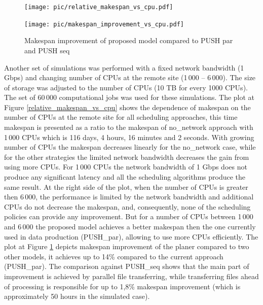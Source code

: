 \documentclass{svjour3}                     %
\begin{document}
\begin{figure}[h]
\centering
\begin{minipage}{.7\textwidth}
\centering
    \texttt{[image: pic/relative\_makespan\_vs\_cpu.pdf]}

    \caption{Dependence of makespan on number of CPUs at the remote node connected over 1 Gbps link.}
    \label{relative_makespan_vs_cpu}
\end{minipage}\hspace{1pc}%
\begin{minipage}{.7\textwidth}
\centering
    \texttt{[image: pic/makespan\_improvement\_vs\_cpu.pdf]}
    \caption{Makespan improvement of proposed model compared to PUSH par and PUSH seq}
    \label{makespan_improvement_vs_cpu}
\end{minipage} 
\end{figure}
Another set of simulations was performed with a fixed network bandwidth (1 Gbps) and changing number of CPUs at the remote site (1\,000 -- 6\,000). The size of storage was adjusted to the number of CPUs (10 TB for every 1000 CPUs). The set of 60\,000 computational jobs was used for these simulations. The plot at Figure \ref{relative_makespan_vs_cpu} shows the dependence of makespan on the number of CPUs at the remote site for all scheduling approaches, this time makespan is presented as a ratio to the makespan of no\_network approach with 1\,000 CPUs which is 116 days, 4 hours, 16 minutes and 2 seconds. With growing number of CPUs the makespan decreases linearly for the no\_network case, while for the other strategies the limited network bandwidth decreases the gain from using more CPUs. For 1\,000 CPUs the network bandwidth of 1 Gbps does not produce any significant latency and all the scheduling algorithms produce the same result. At the right side of the plot, when the number of CPUs is greater then 6\,000, the performance is limited by the network bandwidth and additional CPUs do not decrease the makespan, and, consequently, none of the scheduling policies can provide any improvement. But for a number of CPUs between 1\,000 and 6\,000 the proposed model achieves a better makespan then the one currently used in data production (PUSH\_par), allowing to use more CPUs efficiently. The plot at Figure \ref{makespan_improvement_vs_cpu} depicts makespan improvement of the planer compared to two other models, it achieves up to 14\% compared to the current approach (PUSH\_par). The comparison against PUSH\_seq shows that the main part of improvement is achieved by parallel file transferring, while transferring files ahead of processing is responsible for up to 1,8\% makespan improvement (which is approximately 50 hours in the simulated case).
\end{document}
